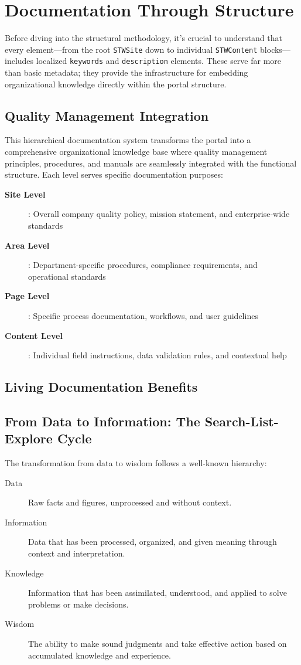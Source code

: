 \section{Documentation Through Structure}
\label{sec:documentation-structure}

Before diving into the structural methodology, it's crucial to understand that every \wbdl{} element—from the root \texttt{STWSite} down to individual \texttt{STWContent} blocks—includes localized \texttt{keywords} and \texttt{description} elements. These serve far more than basic metadata; they provide the infrastructure for embedding organizational knowledge directly within the portal structure.

\subsection{Quality Management Integration}
\label{sec:quality-management}

This hierarchical documentation system transforms the portal into a comprehensive organizational knowledge base where quality management principles, procedures, and manuals are seamlessly integrated with the functional structure. Each level serves specific documentation purposes:

\begin{description}
\item[\textbf{Site Level}]: Overall company quality policy, mission statement, and enterprise-wide standards
\item[\textbf{Area Level}]: Department-specific procedures, compliance requirements, and operational standards
\item[\textbf{Page Level}]: Specific process documentation, workflows, and user guidelines
\item[\textbf{Content Level}]: Individual field instructions, data validation rules, and contextual help
\end{description}

\subsection{Living Documentation Benefits}
\label{sec:living-documentation}

\subsection{From Data to Information: The Search-List-Explore Cycle}
The transformation from data to wisdom follows a well-known hierarchy:
\begin{description}
  \item[Data] Raw facts and figures, unprocessed and without context.
  \item[Information] Data that has been processed, organized, and given meaning through context and interpretation.
  \item[Knowledge] Information that has been assimilated, understood, and applied to solve problems or make decisions.
  \item[Wisdom] The ability to make sound judgments and take effective action based on accumulated knowledge and experience.
\end{description}

